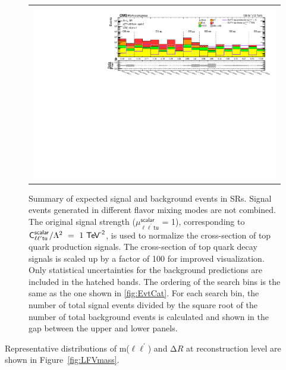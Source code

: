 \begin{figure}[tbh!]
 \begin{center}
 \begin{tabular}{c}
 \includegraphics[width=\textwidth]{figures/Part4/Evt/Summary_llOffZMetg20B1}
 \end{tabular}
 \caption{Summary of expected signal and background events in \acp{SR}. Signal events generated in different flavor mixing modes are not combined. The original signal strength ($\mu_{\ell\ell^{\prime}\textsf{tu}}^{\textsf{scalar}}$ = 1), corresponding to $\textsf{C}_{\ell\ell^{\prime}\textsf{tu}}^{\textsf{scalar}}/\mathrm{\Lambda}^2~=~1~\textsf{TeV}^{\textsf{-2}}$, is used to normalize the cross-section of top quark production signals. The cross-section of top quark decay signals is scaled up by a factor of 100 for improved visualization. Only statistical uncertainties for the background predictions are included in the hatched bands. The ordering of the search bins is the same as the one shown in \ref{fig:EvtCat}. For each search bin, the number of total signal events divided by the square root of the number of total background events is calculated and shown in the gap between the upper and lower panels.}
 \label{fig:Summary}
 \end{center}
 \end{figure}
 
Representative distributions of m($\ell\ell^{\prime}$) and $\mathrm{\Delta}R$ at reconstruction level are shown in Figure~\ref{fig:LFVmass}.
 
